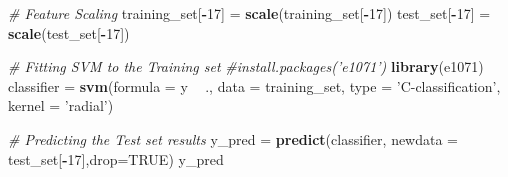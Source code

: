 \documentclass[
]{article}
\newenvironment{Shaded}{\begin{snugshade}}{\end{snugshade}}
\newcommand{\CommentTok}[1]{\textcolor[rgb]{0.56,0.35,0.01}{\textit{#1}}}
\newcommand{\DataTypeTok}[1]{\textcolor[rgb]{0.13,0.29,0.53}{#1}}
\newcommand{\DecValTok}[1]{\textcolor[rgb]{0.00,0.00,0.81}{#1}}
\newcommand{\KeywordTok}[1]{\textcolor[rgb]{0.13,0.29,0.53}{\textbf{#1}}}
\newcommand{\NormalTok}[1]{#1}
\newcommand{\OperatorTok}[1]{\textcolor[rgb]{0.81,0.36,0.00}{\textbf{#1}}}
\newcommand{\OtherTok}[1]{\textcolor[rgb]{0.56,0.35,0.01}{#1}}
\newcommand{\StringTok}[1]{\textcolor[rgb]{0.31,0.60,0.02}{#1}}
\begin{document}
\begin{Shaded}
\begin{Highlighting}[]
\CommentTok{# Feature Scaling}
\NormalTok{training_set[}\OperatorTok{-}\DecValTok{17}\NormalTok{] =}\StringTok{ }\KeywordTok{scale}\NormalTok{(training_set[}\OperatorTok{-}\DecValTok{17}\NormalTok{])}
\NormalTok{test_set[}\OperatorTok{-}\DecValTok{17}\NormalTok{] =}\StringTok{ }\KeywordTok{scale}\NormalTok{(test_set[}\OperatorTok{-}\DecValTok{17}\NormalTok{])}

\CommentTok{# Fitting SVM to the Training set}
\CommentTok{#install.packages('e1071')}
\KeywordTok{library}\NormalTok{(e1071)}
\NormalTok{classifier =}\StringTok{ }\KeywordTok{svm}\NormalTok{(}\DataTypeTok{formula =}\NormalTok{ y }\OperatorTok{~}\StringTok{ }\NormalTok{.,}
                 \DataTypeTok{data =}\NormalTok{ training_set,}
                 \DataTypeTok{type =} \StringTok{'C-classification'}\NormalTok{,}
                 \DataTypeTok{kernel =} \StringTok{'radial'}\NormalTok{)}

\CommentTok{# Predicting the Test set results}
\NormalTok{y_pred =}\StringTok{ }\KeywordTok{predict}\NormalTok{(classifier, }\DataTypeTok{newdata =}\NormalTok{ test_set[}\OperatorTok{-}\DecValTok{17}\NormalTok{],}\DataTypeTok{drop=}\OtherTok{TRUE}\NormalTok{)}
\NormalTok{y_pred}
\end{Highlighting}
\end{Shaded}
\end{document}
